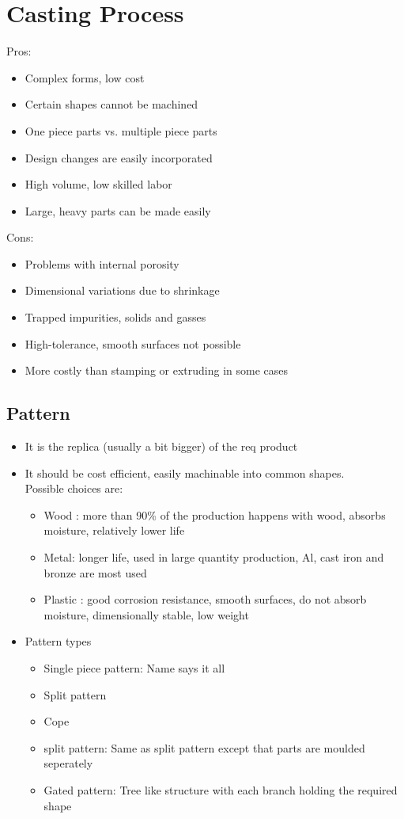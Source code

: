\documentclass{article}
\begin{document}
\section{Casting Process}

	Pros:
	\begin{itemize}
		\item Complex forms, low cost
		\item Certain shapes cannot be machined
		\item One piece parts vs. multiple piece parts
		\item Design changes are easily incorporated
		\item High volume, low skilled labor
		\item Large, heavy parts can be made easily
	\end{itemize}

	\noindent Cons:
	\begin{itemize}
		\item Problems with internal porosity
		\item Dimensional variations due to shrinkage
		\item Trapped impurities, solids and gasses
		\item High-tolerance, smooth surfaces not possible
		\item More costly than stamping or extruding in some cases
	\end{itemize}

	\subsection{Pattern} 
	\begin{itemize}
		\item It is the replica (usually a bit bigger) of the req product 
		\item It should be cost efficient, easily machinable into common shapes.\\
		Possible choices are: 
		\begin{itemize}
			\item Wood : more than 90\% of the production happens with wood, absorbs moisture, relatively lower life
			\item Metal: longer life, used in large quantity production, Al, cast iron and bronze are most used
			\item Plastic : good corrosion resistance, smooth surfaces, do not absorb moisture, dimensionally stable, low weight
		\end{itemize}
		\item Pattern types
		\begin{itemize}
			\item Single piece pattern: Name says it all
			\item Split pattern
			\item Cope \item split pattern: Same as split pattern except that parts are moulded seperately
			\item Gated pattern: Tree like structure with each branch holding the required shape
		\end{itemize}
	\end{itemize}
\end{document}
